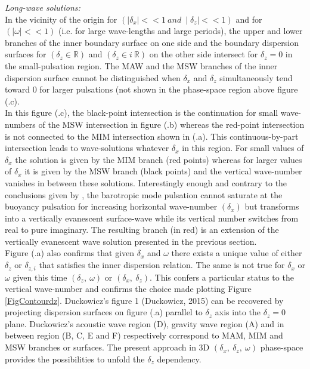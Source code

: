 \documentclass[a4paper,11pt]{article}
\begin{document}
\textit{Long-wave solutions:}\\
In the vicinity of the origin for  $(\mid\delta_x\mid <<1\  and\ \mid\delta_z\mid << 1)$ and for $(\mid\omega\mid <<1)$ (i.e. for large wave-lengths and large periods), the upper and lower branches of the inner boundary surface on one side and the boundary dispersion surfaces for $(\delta_z\in\mathbb{R})$ and $(\delta_z\in i\ \mathbb{R})$ on the other side intersect for $\delta_z=0$ in the small-pulsation region. The MAW and the MSW branches of the inner dispersion surface cannot be distinguished when $\delta_x$ and $\delta_z$ simultaneously tend toward 0 for larger pulsations (not shown in the phase-space region above figure (.c).\\
In this figure (.c), the black-point intersection is the continuation for small wave-numbers of the MSW intersection in figure (.b) whereas the red-point intersection is not connected to the MIM intersection shown in (.a). This continuous-by-part intersection leads to wave-solutions whatever $\delta_x$ in this region. For small values of $\delta_x$ the solution is given by the MIM branch (red points) whereas for larger values of $\delta_x$ it is given by the MSW branch (black points) and the vertical wave-number vanishes in between these solutions. Interestingly enough and contrary to the conclusions given by \cite{dukowicz_2013}, the barotropic mode pulsation cannot saturate at the buoyancy pulsation for increasing horizontal wave-number $(\delta_x)$ but transforms into a vertically evanescent surface-wave while its vertical number switches from real to pure imaginary. The resulting branch (in red) is an extension of the vertically evanescent wave solution presented in the previous section.\\
Figure (.a) also confirms that given $\delta_x$ and $\omega$ there exists a unique value of either $\delta_z$ or $\delta_{z,i}$ that satisfies the inner dispersion relation. The same is not true for $\delta_x$ or $\omega$ given this time $(\delta_z,\ \omega)$ or $(\delta_x,\ \delta_z)$. This confers a particular status to the vertical wave-number and confirms the choice made plotting Figure \ref{FigContourdz}. Duckowicz's figure 1 (Duckowicz, 2015) can be recovered by projecting dispersion surfaces on figure (.a) parallel to $\delta_z$ axis into the $\delta_z=0$ plane. Duckowicz's acoustic wave region (D), gravity wave region (A) and in between region (B, C, E and F) respectively correspond to MAM, MIM and MSW branches or surfaces. The present approach in 3D $(\delta_x,\ \delta_z,\ \omega)$ phase-space provides the possibilities to unfold the $\delta_z$ dependency. \\
\end{document}

